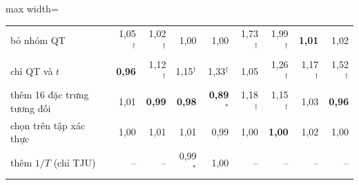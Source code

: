\begin{table}[!htbp]
\begin{adjustbox}{max width=\textwidth}
\begin{tabular}{lrrrrrrrr}
bỏ nhóm QT & 1{,}05$^{\dagger}$ & 1{,}02$^{\dagger}$ & 1{,}00 & 1{,}00 & 1{,}73$^{\dagger}$ & 1{,}99$^{\dagger}$ & \textbf{1{,}01} & 1{,}02 \\
chỉ QT và $t$ & \textbf{0{,}96} & 1{,}12$^{\dagger}$ & 1{,}15$^{\dagger}$ & 1{,}33$^{\dagger}$ & 1{,}05 & 1{,}26$^{\dagger}$ & 1{,}17$^{\dagger}$ & 1{,}52$^{\dagger}$ \\
thêm 16 đặc trưng tương đối & 1{,}01 & \textbf{0{,}99} & \textbf{0{,}98} & \textbf{0{,}89}$^{*}$ & 1{,}18$^{\dagger}$ & 1{,}15$^{\dagger}$ & 1{,}03 & \textbf{0{,}96} \\
chọn trên tập xác thực & 1{,}00 & 1{,}01 & 1{,}01 & 0{,}99 & 1{,}00 & \textbf{1{,}00} & 1{,}02 & 1{,}00 \\
thêm $1/T$ (chỉ TJU) & -- & -- & 0{,}99$^{*}$ & 1{,}00 & -- & -- & -- & -- \\
\bottomrule\end{tabular}\end{adjustbox}\end{table}
